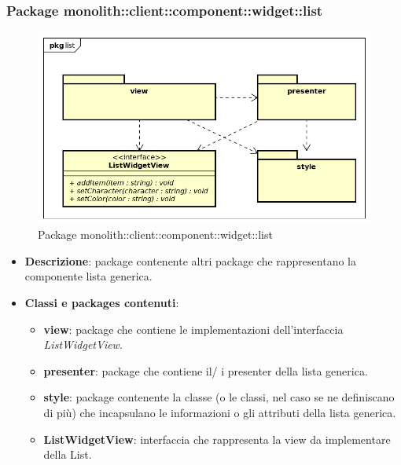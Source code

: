 \subsubsection{Package monolith::client::component::widget::list}
\label{Package monolith::client::component::widget::list}
\begin{figure}[H]
	\centering
	\includegraphics[scale=0.5]{Sezioni/Packages/SDK/list.png}
	\caption{Package monolith::client::component::widget::list}
\end{figure}
\begin{itemize}
\item \textbf{Descrizione}: package contenente altri package che rappresentano la componente lista generica.
\item \textbf{Classi e packages contenuti}:
\begin{itemize}
\item \textbf{view}: package che contiene le implementazioni dell'interfaccia \textit{ListWidgetView}.
\item \textbf{presenter}: package che contiene il/ i presenter della lista generica.
\item \textbf{style}: package contenente la classe (o le classi, nel caso se ne definiscano di più) che incapsulano le informazioni o gli attributi della lista generica.
\item \textbf{ListWidgetView}: interfaccia che rappresenta la view da implementare della List.
\end{itemize}
\end{itemize}

